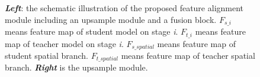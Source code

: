 \begin{figure}[ht]
  \centering
  \quad %
   \caption{\textit{\textbf{Left}}: the schematic illustration of the proposed feature alignment module including an upsample module and a fusion block. \textit{$F_{s\_i}$} means feature map of student model on stage \textit{i}. \textit{$F_{t\_i}$} means feature map of teacher model on stage \textit{i}. \textit{$F_{s\_spatial}$} means feature map of student spatial branch. \textit{$F_{t\_spatial}$} means feature map of teacher spatial branch.
  \textit{\textbf{Right}} is the upsample module.}
  \label{fig:feat_align_upsample}
\end{figure}
